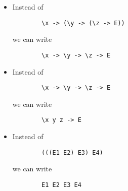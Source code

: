 \documentclass[letterpaper]{article}
\begin{document}
\begin{itemize}
    \item Instead of 
    \begin{verbatim}
        \x -> (\y -> (\z -> E))
    \end{verbatim}
    we can write 
    \begin{verbatim}
        \x -> \y -> \z -> E
    \end{verbatim}

    \item Instead of 
    \begin{verbatim}
        \x -> \y -> \z -> E
    \end{verbatim}
    we can write 
    \begin{verbatim}
        \x y z -> E
    \end{verbatim}

    \item Instead of 
    \begin{verbatim}
        (((E1 E2) E3) E4)
    \end{verbatim}
    we can write 
    \begin{verbatim}
        E1 E2 E3 E4
    \end{verbatim}
\end{itemize}
\end{document}
